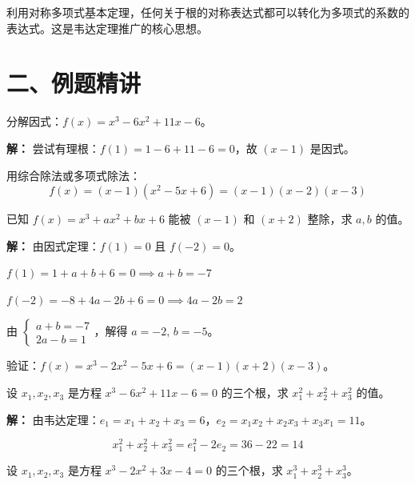 \documentclass[12pt, a4paper]{ctexart}
\begin{document}
\begin{warnbox}[对称多项式与韦达定理的联系]
利用对称多项式基本定理，任何关于根的对称表达式都可以转化为多项式的系数的表达式。这是韦达定理推广的核心思想。
\end{warnbox}

\section*{\textcolor{examorange}{二、例题精讲}}

\begin{examplebox}[【例题1】因式定理分解高次多项式]
分解因式：$f(x) = x^3 - 6x^2 + 11x - 6$。
\end{examplebox}

\textbf{解：} 尝试有理根：$f(1) = 1 - 6 + 11 - 6 = 0$，故 $(x-1)$ 是因式。

用综合除法或多项式除法：
\[
f(x) = (x-1)(x^2 - 5x + 6) = (x-1)(x-2)(x-3)
\]

\begin{examplebox}[【例题2】余数定理求参数]
已知 $f(x) = x^3 + ax^2 + bx + 6$ 能被 $(x-1)$ 和 $(x+2)$ 整除，求 $a, b$ 的值。
\end{examplebox}

\textbf{解：} 由因式定理：$f(1)=0$ 且 $f(-2)=0$。

$f(1) = 1 + a + b + 6 = 0 \implies a + b = -7$

$f(-2) = -8 + 4a - 2b + 6 = 0 \implies 4a - 2b = 2$

由 $\begin{cases} a+b=-7 \\ 2a-b=1 \end{cases}$，解得 $a=-2,\, b=-5$。

验证：$f(x) = x^3 - 2x^2 - 5x + 6 = (x-1)(x+2)(x-3)$。

\begin{examplebox}[【例题3】高次韦达定理直接应用]
设 $x_1, x_2, x_3$ 是方程 $x^3 - 6x^2 + 11x - 6 = 0$ 的三个根，求 $x_1^2 + x_2^2 + x_3^2$ 的值。
\end{examplebox}

\textbf{解：} 由韦达定理：$e_1 = x_1+x_2+x_3 = 6$，$e_2 = x_1x_2+x_2x_3+x_3x_1 = 11$。

\[
x_1^2+x_2^2+x_3^2 = e_1^2 - 2e_2 = 36 - 22 = 14
\]

\begin{examplebox}[【例题4】牛顿恒等式求幂和]
设 $x_1, x_2, x_3$ 是方程 $x^3 - 2x^2 + 3x - 4 = 0$ 的三个根，求 $x_1^3 + x_2^3 + x_3^3$。
\end{examplebox}
\end{document}
